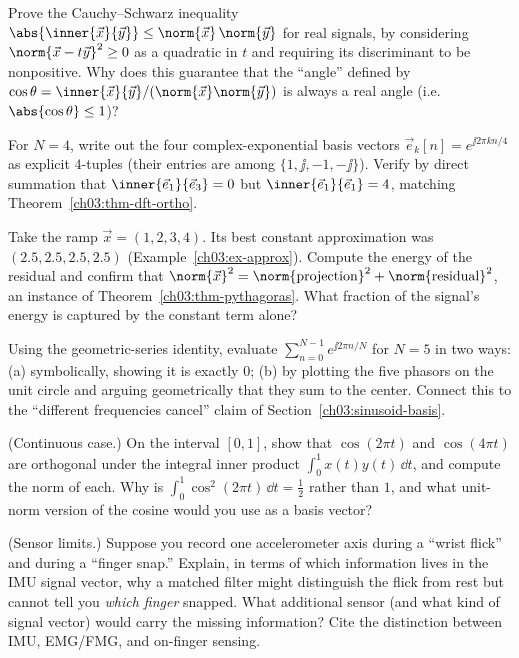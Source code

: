 \begin{exercise}
Prove the Cauchy--Schwarz inequality $\abs{\inner{\vec{x}}{\vec{y}}} \le \norm{\vec{x}}\,
\norm{\vec{y}}$ for real signals, by considering $\norm{\vec{x}-t\vec{y}}^2 \ge 0$ as a quadratic in
$t$ and requiring its discriminant to be nonpositive. Why does this guarantee that the ``angle''
defined by $\cos\theta = \inner{\vec{x}}{\vec{y}}/(\norm{\vec{x}}\norm{\vec{y}})$ is always a real
angle (i.e.\ $\abs{\cos\theta}\le 1$)?
\end{exercise}

\begin{exercise}
For $N=4$, write out the four complex-exponential basis vectors $\vec{e}_k[n]=e^{\jj 2\pi kn/4}$ as
explicit $4$-tuples (their entries are among $\{1,\jj,-1,-\jj\}$). Verify by direct summation that
$\inner{\vec{e}_1}{\vec{e}_3}=0$ but $\inner{\vec{e}_1}{\vec{e}_1}=4$, matching
Theorem~\ref{ch03:thm-dft-ortho}.
\end{exercise}

\begin{exercise}
Take the ramp $\vec{x}=(1,2,3,4)$. Its best constant approximation was $(2.5,2.5,2.5,2.5)$
(Example~\ref{ch03:ex-approx}). Compute the energy of the residual and confirm that
$\norm{\vec{x}}^2 = \norm{\text{projection}}^2 + \norm{\text{residual}}^2$, an instance of
Theorem~\ref{ch03:thm-pythagoras}. What fraction of the signal's energy is captured by the constant
term alone?
\end{exercise}

\begin{exercise}
Using the geometric-series identity, evaluate $\sum_{n=0}^{N-1} e^{\jj 2\pi n/N}$ for $N=5$ in two
ways: (a) symbolically, showing it is exactly $0$; (b) by plotting the five phasors on the unit
circle and arguing geometrically that they sum to the center. Connect this to the ``different
frequencies cancel'' claim of Section~\ref{ch03:sinusoid-basis}.
\end{exercise}

\begin{exercise}
(Continuous case.) On the interval $[0,1]$, show that $\cos(2\pi t)$ and $\cos(4\pi t)$ are
orthogonal under the integral inner product $\int_0^1 x(t)y(t)\,\dd t$, and compute the norm of each.
Why is $\int_0^1 \cos^2(2\pi t)\,\dd t = \tfrac12$ rather than $1$, and what unit-norm version of the
cosine would you use as a basis vector?
\end{exercise}

\begin{exercise}
(Sensor limits.) Suppose you record one accelerometer axis during a ``wrist flick'' and during a
``finger snap.'' Explain, in terms of which information lives in the IMU signal vector, why a matched
filter might distinguish the flick from rest but cannot tell you \emph{which finger} snapped. What
additional sensor (and what kind of signal vector) would carry the missing information? Cite the
distinction between IMU, EMG/FMG, and on-finger sensing.
\end{exercise}


